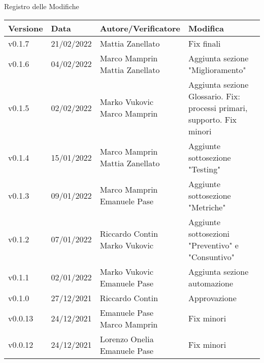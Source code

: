 \begin{center}
  \huge{Registro delle Modifiche}
\end{center}
\newcommand{\aCapo}[1]{%
  \begin{tabular}{@{}c@{}}\strut#1\strut\end{tabular}%
}

\begin{center}
  \begin{longtable}{|p{1.8cm}|p{2.2cm}|p{4.2cm}|p{4.6cm}|}
      \hline
      \textbf{Versione} & \textbf{Data} & \textbf{Autore/Verificatore} & \textbf{Modifica}                    \\ \hline
      v0.1.7            & 21/02/2022    & \aCapo{Mattia Zanellato\\} & Fix finali   \\ \hline
      v0.1.6            & 04/02/2022    & \aCapo{Marco Mamprin\\Mattia Zanellato} & Aggiunta sezione "Miglioramento"   \\ \hline
      v0.1.5            & 02/02/2022    & \aCapo{Marko Vukovic\\Marco Mamprin} & Aggiunta sezione Glossario. Fix: processi primari, supporto. Fix minori   \\ \hline
      v0.1.4            & 15/01/2022    & \aCapo{Marco Mamprin\\Mattia Zanellato} & Aggiunte sottosezione "Testing"  \\ \hline
      v0.1.3            & 09/01/2022    & \aCapo{Marco Mamprin\\Emanuele Pase} & Aggiunte sottosezione "Metriche"  \\ \hline
      v0.1.2            & 07/01/2022    & \aCapo{Riccardo Contin\\Marko Vukovic} & Aggiunte sottosezioni "Preventivo" e "Consuntivo"  \\ \hline
      v0.1.1            & 02/01/2022    & \aCapo{Marko Vukovic\\Emanuele Pase} & Aggiunta sezione automazione  \\ \hline
      v0.1.0            & 27/12/2021    & Riccardo Contin & Approvazione  \\ \hline
      v0.0.13           & 24/12/2021    & \aCapo{Emanuele Pase\\Marco Mamprin} & Fix minori  \\ \hline
      v0.0.12           & 24/12/2021    & \aCapo{Lorenzo Onelia\\Emanuele Pase} & Fix minori \\ \hline

\end{longtable}
\end{center}
